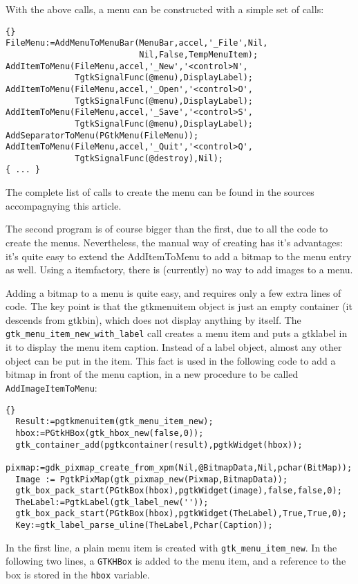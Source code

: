 \documentclass[10pt]{article}
\begin{document}
With the above calls, a menu can be constructed with a simple set of calls:
\begin{lstlisting}{}
FileMenu:=AddMenuToMenuBar(MenuBar,accel,'_File',Nil,
                           Nil,False,TempMenuItem);
AddItemToMenu(FileMenu,accel,'_New','<control>N',
              TgtkSignalFunc(@menu),DisplayLabel);
AddItemToMenu(FileMenu,accel,'_Open','<control>O',
              TgtkSignalFunc(@menu),DisplayLabel);
AddItemToMenu(FileMenu,accel,'_Save','<control>S',
              TgtkSignalFunc(@menu),DisplayLabel);
AddSeparatorToMenu(PGtkMenu(FileMenu));
AddItemToMenu(FileMenu,accel,'_Quit','<control>Q',
              TgtkSignalFunc(@destroy),Nil);
{ ... } 
\end{lstlisting}
The complete list of calls to create the menu can be found in the sources
accompagnying this article.

The second program is of course bigger than the first, due to all the code
to create the menus. Nevertheless, the manual way of creating has it's
advantages: it's quite easy to extend the AddItemToMenu to add a bitmap to
the menu entry as well. Using a itemfactory, there is (currently) no way to
add images to a menu.

Adding a bitmap to a menu is quite easy, and requires only a few extra
lines of code. The key point is that the gtkmenuitem object is just an empty
container (it descends from gtkbin), which does not display anything by itself. The
\lstinline|gtk_menu_item_new_with_label| call creates a menu item and puts a
gtklabel in it to display the menu item caption. Instead of a label object,
almost any other object can be put in the item. This fact is used in the
following code to add a bitmap in front of the menu caption, in a new
procedure to be called \lstinline|AddImageItemToMenu|:
\begin{lstlisting}{}
  Result:=pgtkmenuitem(gtk_menu_item_new);
  hbox:=PGtkHBox(gtk_hbox_new(false,0));  
  gtk_container_add(pgtkcontainer(result),pgtkWidget(hbox));
  pixmap:=gdk_pixmap_create_from_xpm(Nil,@BitmapData,Nil,pchar(BitMap));
  Image := PgtkPixMap(gtk_pixmap_new(Pixmap,BitmapData));
  gtk_box_pack_start(PGtkBox(hbox),pgtkWidget(image),false,false,0);
  TheLabel:=PgtkLabel(gtk_label_new(''));
  gtk_box_pack_start(PGtkBox(hbox),pgtkWidget(TheLabel),True,True,0);
  Key:=gtk_label_parse_uline(TheLabel,Pchar(Caption));
\end{lstlisting}
In the first line, a plain menu item is created with
\lstinline|gtk_menu_item_new|. In the following two lines,
a \lstinline|GTKHBox| is added to the menu item, and a reference to the box
is stored in the \lstinline|hbox| variable.
\end{document}
